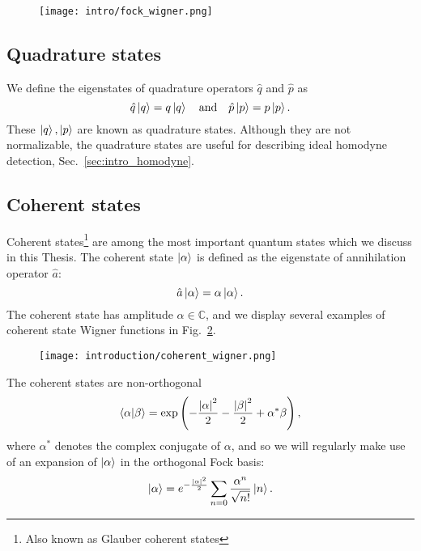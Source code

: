 \begin{figure}[htp]
\centering
\texttt{[image: intro/fock\_wigner.png]}
\caption{\label{fig:intro_fock_wigner}}
\end{figure}


\subsection{Quadrature states}
We define the eigenstates of quadrature operators $\hat{q}$ and $\hat{p}$ as
\begin{equation}
\hat{q}\ket{q} = q \ket{q} \qq{and} \hat{p}\ket{p} = p \ket{p}.
\end{equation}
These $\ket{q}, \ket{p}$ are known as quadrature states. Although they are not normalizable, the quadrature states are useful for describing ideal homodyne detection, Sec.~\ref{sec:intro_homodyne}. %

\subsection{Coherent states}
Coherent states\footnote{Also known as Glauber coherent states} are among the most important quantum states which we discuss in this Thesis. The coherent state $\ket{\alpha}$ is defined as the eigenstate of annihilation operator $\hat{a}$:
\begin{equation}
\hat{a}\ket{\alpha} = \alpha \ket{\alpha}.
\end{equation}
The coherent state has amplitude $\alpha \in \mathbb{C}$, and we display several examples of coherent state Wigner functions in Fig.~\ref{fig:intro_coherent_wigner}.

\begin{figure}[htp]
\centering
\texttt{[image: introduction/coherent\_wigner.png]}
\caption{\label{fig:intro_coherent_wigner}}
\end{figure}

The coherent states are non-orthogonal
\begin{equation}
\ip{\alpha}{\beta} = \exp\left(- \frac{\left|\alpha\right|^2}{2} - \frac{\left|\beta\right|^2}{2} + \alpha^* \beta \right),
\end{equation}
where $\alpha^*$ denotes the complex conjugate of $\alpha$, and so we will regularly make use of an expansion of $\ket{\alpha}$ in the orthogonal Fock basis:
\begin{equation}
\ket{\alpha} = e^{-\frac{\left|\alpha\right|^2}{2}} \sum_{n=0} \frac{\alpha^n}{\sqrt{n!}} \ket{n}.
\end{equation}


